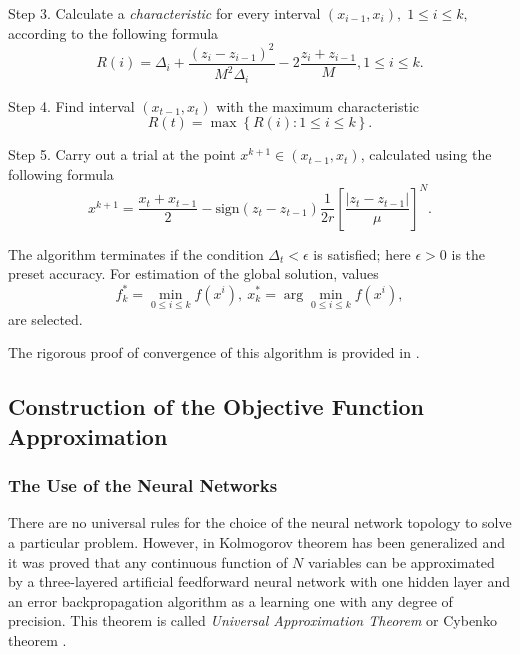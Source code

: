 \documentclass[applsci,article,submit,moreauthors,pdftex]{Definitions/mdpi}
\begin{document}
Step 3. Calculate a \textit{characteristic} for every interval $(x_{i-1}, x_i), \; 1\leq i \leq k,$   according to the following formula
\begin{equation}\label{R}
R(i)=\Delta_i+\frac{(z_i-z_{i-1})^2}{M^2\Delta_i}-2\frac{z_i+z_{i-1}}{M},1 \leq i \leq k.
\end{equation}

Step 4. Find interval $(x_{t-1},x_t)$ with the maximum characteristic
\begin{equation}\label{MaxR}
R(t)=\max{\left\{R(i): 1 \leq i \leq k \right\}}.
\end{equation}

Step 5. Carry out a trial at the point $x^{k+1}\in(x_{t-1},x_t)$, calculated using the following formula
\begin{equation}\label{NewX}
x^{k+1} = \frac{x_t+x_{t-1}}{2} - \mathrm{sign}(z_t-z_{t-1})\frac{1}{2r}\left[\frac{\left|z_t-z_{t-1}\right|}{\mu}\right]^N.
\end{equation}

The algorithm terminates if the condition $\Delta_t<\epsilon$ is satisfied; here $\epsilon>0$ is the preset accuracy. For estimation of the global solution, values
\[
f_k^\ast=\min_{0\leq i \leq k}f(x^i), \ x_k^\ast=\arg \min_{0\leq i \leq k}f(x^i),
\]
are selected.

The rigorous proof of convergence of this algorithm is provided in \cite{Strongin2000}. 



\subsection{Construction of the Objective Function Approximation}

\subsubsection{The Use of the Neural Networks}

There are no universal rules for the choice of the neural network topology to solve a particular problem. However, in \cite{Cybenko1989} Kolmogorov theorem has been generalized and it was proved that any continuous function of $N$ variables can be approximated by a three-layered artificial feedforward neural network with one hidden layer and an error backpropagation algorithm as a learning one with any degree of precision. This theorem is called \textit{Universal Approximation Theorem} or Cybenko theorem \cite{Hassoun1995}.
\end{document}
